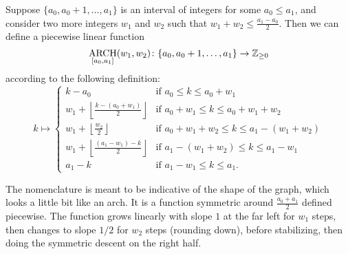 \begin{definition}
  \label{def:arch}
  Suppose $\{a_0, a_0 + 1, \dots, a_1\}$ is an interval of integers for some $a_0 \le a_1$,
  and consider two more integers $w_1$ and $w_2$ such that $w_1 + w_2 \le \frac{a_1-a_0}{2}$.
  Then we can define a piecewise linear function
  \[ \operatorname*{ARCH}_{[a_0, a_1]}(w_1, w_2) \colon \{a_0, a_0+1, \dots, a_1\} \to \mathbb Z_{\ge 0} \]
  according to the following definition:
  \[
    k \mapsto
    \begin{cases}
      k - a_0 & \text{if }a_0 \le k \le a_0 + w_1 \\
      w_1 + \left\lfloor \frac{k-(a_0+w_1)}{2} \right\rfloor & \text{if } a_0 + w_1 \le k \le a_0 + w_1 + w_2 \\
      w_1 + \left\lfloor \frac{w_2}{2} \right\rfloor & \text{if } a_0 + w_1 + w_2 \le k \le a_1 - (w_1 + w_2)\\
      w_1 + \left\lfloor \frac{(a_1-w_1) - k}{2} \right\rfloor & \text{if } a_1 - (w_1 + w_2) \le k \le a_1 - w_1 \\
      a_1 - k & \text{if }a_1 - w_1 \le k \le a_1.
    \end{cases}
  \]
\end{definition}
The nomenclature is meant to be indicative of the shape of the graph,
which looks a little bit like an arch.
It is a function symmetric around $\frac{a_0+a_1}{2}$ defined piecewise.
The function grows linearly with slope $1$ at the far left for $w_1$ steps,
then changes to slope $1/2$ for $w_2$ steps (rounding down),
before stabilizing, then doing the symmetric descent on the right half.
